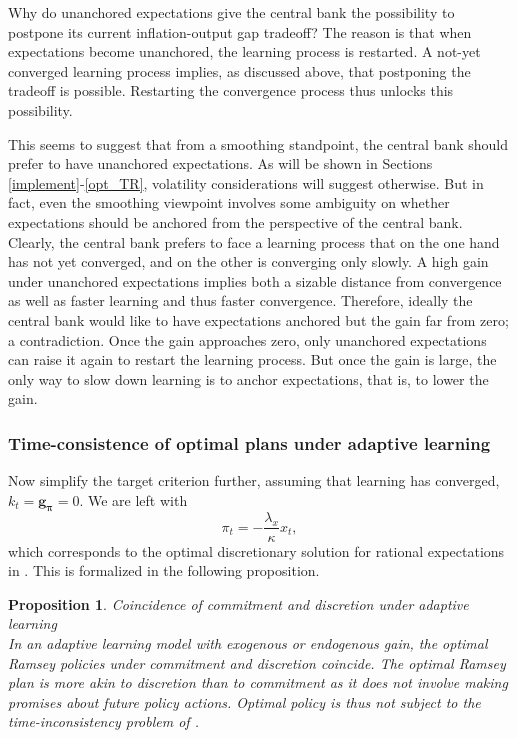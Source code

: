 \documentclass[11pt]{article}
\renewcommand{\[}{\begin{equation}}
\renewcommand{\]}{\end{equation}}
\newtheorem{prop}{Proposition}
\begin{document}
Why do unanchored expectations give the central bank the possibility to postpone its current inflation-output gap tradeoff? The reason is that when expectations become unanchored, the learning process is restarted. A not-yet converged learning process implies, as discussed above, that postponing the tradeoff is possible. Restarting the convergence process thus unlocks this possibility. 

This seems to suggest that from a smoothing standpoint, the central bank should prefer to have unanchored expectations. As will be shown in Sections \ref{implement}-\ref{opt_TR}, volatility considerations will suggest otherwise. But in fact, even the smoothing viewpoint involves some ambiguity on whether expectations should be anchored from the perspective of the central bank. Clearly, the central bank prefers to face a learning process that on the one hand has not yet converged, and on the other is converging only slowly. A high gain under unanchored expectations implies both a sizable distance from convergence as well as faster learning and thus faster convergence. Therefore, ideally the central bank would like to have expectations anchored but the gain far from zero; a contradiction. Once the gain approaches zero, only unanchored expectations can raise it again to restart the learning process. But once the gain is large, the only way to slow down learning is to anchor expectations, that is, to lower the gain.


\subsubsection{Time-consistence of optimal plans under adaptive learning}
Now simplify the target criterion further, assuming that learning has converged, $k_t = \mathbf{g_\pi} = 0$. We are left with 
\begin{equation}
\pi_t  = -\frac{\lambda_x}{\kappa}x_t \label{cgg_discretion},
\end{equation}
which corresponds to the optimal discretionary solution for rational expectations in \cite{clarida1999science}. This is formalized in the following proposition.

\begin{prop} Coincidence of commitment and discretion under adaptive learning \\
In an adaptive learning model with exogenous or endogenous gain, the optimal Ramsey policies under commitment and discretion coincide. The optimal Ramsey plan is more akin to discretion than to commitment as it does not involve making promises about future policy actions. Optimal policy is thus not subject to the time-inconsistency problem of \cite{kydland1977rules}.
\label{result_no_commitment}
\end{prop}
\end{document}
